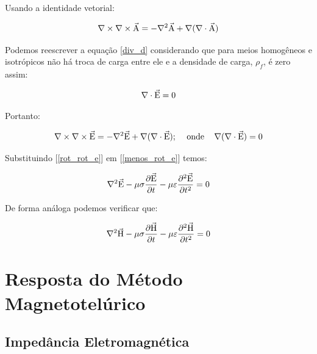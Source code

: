             Usando a identidade vetorial:
            
            \begin{equation}
             \nabla \times \nabla \times \vec{\textrm{A}} = -\nabla^2 \vec{\textrm{A}} + \nabla(\nabla \cdot \vec{\textrm{A}})
            \end{equation}
            
            Podemos reescrever a equação \ref{div_d} considerando que para meios homogêneos e isotrópicos não há troca de carga entre ele e a densidade de carga, $\rho_f$, é zero assim:
            
            \begin{equation}
             \nabla \cdot \vec{\textrm{E}} = 0
            \end{equation}
            
            Portanto:
            
            \begin{equation}
             \label{rot_rot_e}
             \nabla \times \nabla \times \vec{\textrm{E}} = -\nabla^2 \vec{\textrm{E}} + \nabla(\nabla \cdot \vec{\textrm{E}});\,\,\,\,\,\,\, \textrm{onde}\,\,\,\,\,\,\,   \nabla(\nabla \cdot \vec{\textrm{E}})=0
            \end{equation}
            
            Substituindo [\ref{rot_rot_e}] em [\ref{menos_rot_e}] temos:
            
            \begin{equation}
             \nabla^2 \vec{\textrm{E}} - \mu \sigma \dfrac{\partial \vec{\textrm{E}}}{\partial t} - \mu \varepsilon \dfrac{\partial^2 \vec{\textrm{E}}}{\partial t^2} = 0
            \end{equation}
            
            De forma análoga podemos verificar que:
            
            \begin{equation}
             \nabla^2 \vec{\textrm{H}} - \mu \sigma \dfrac{\partial \vec{\textrm{H}}}{\partial t} - \mu \varepsilon \dfrac{\partial^2 \vec{\textrm{H}}}{\partial t^2} = 0
            \end{equation}

 
    
    
    
    \section{Resposta do Método Magnetotelúrico}
        \subsection{Impedância Eletromagnética}
        
